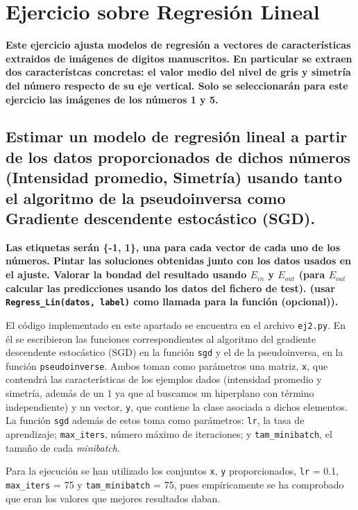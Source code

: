 \documentclass[a4paper, 20pt]{article}
\begin{document}
\section{Ejercicio sobre Regresión Lineal}
\textbf{Este ejercicio ajusta modelos de regresión a vectores de características extraidos de imágenes de digitos manuscritos. En particular se extraen dos característcas concretas: el valor medio del nivel de gris y simetría del número respecto de su eje vertical. Solo se seleccionarán para este ejercicio las imágenes de los números 1 y 5.}

\subsection{Estimar un modelo de regresión lineal a partir de los datos proporcionados de dichos números (Intensidad promedio, Simetría) usando tanto el algoritmo de la pseudoinversa como Gradiente descendente estocástico (SGD).}
\textbf{Las etiquetas serán \{-1, 1\}, una para cada vector de cada uno de los números. Pintar las soluciones obtenidas junto con los datos usados en el ajuste. Valorar la bondad del resultado usando $E_{in}$ y $E_{out}$ (para $E_{out}$ calcular las predicciones usando los datos del fichero de test). (usar \texttt{Regress\_Lin(datos, label)} como llamada para la función (opcional)).}

El código implementado en este apartado se encuentra en el archivo \texttt{ej2.py}. En él se escribieron las funciones correspondientes al algoritmo del gradiente descendente estocástico (SGD) en la función \texttt{sgd} y el de la pseudoinversa, en la función \texttt{pseudoinverse}. Ambos toman como parámetros una matriz, \texttt{x}, que contendrá las características de los ejemplos dados (intensidad promedio y simetría, además de un 1 ya que al buscamos un hiperplano con término independiente) y un vector, \texttt{y}, que contiene la clase asociada a dichos elementos. La función \texttt{sgd} además de estos toma como parámetros: \texttt{lr}, la tasa de aprendizaje; \texttt{max\_iters}, número máximo de iteraciones; y \texttt{tam\_minibatch}, el tamaño de cada \textit{minibatch}.

Para la ejecución se han utilizado los conjuntos \texttt{x}, \texttt{y} proporcionados, \texttt{lr} = 0.1, \texttt{max\_iters} = 75 y \texttt{tam\_minibatch} = 75, pues empíricamente se ha comprobado que eran los valores que mejores resultados daban.
\end{document}
